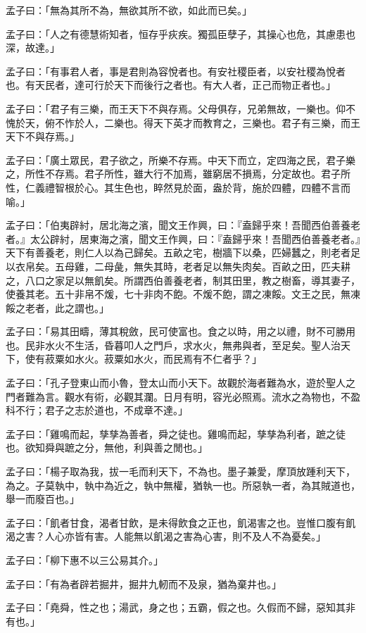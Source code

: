 \begin{pinyinscope}
孟子曰：「無為其所不為，無欲其所不欲，如此而已矣。」

孟子曰：「人之有德慧術知者，恒存乎疢疾。獨孤臣孽子，其操心也危，其慮患也深，故達。」

孟子曰：「有事君人者，事是君則為容悅者也。有安社稷臣者，以安社稷為悅者也。有天民者，達可行於天下而後行之者也。有大人者，正己而物正者也。」

孟子曰：「君子有三樂，而王天下不與存焉。父母俱存，兄弟無故，一樂也。仰不愧於天，俯不怍於人，二樂也。得天下英才而教育之，三樂也。君子有三樂，而王天下不與存焉。」

孟子曰：「廣土眾民，君子欲之，所樂不存焉。中天下而立，定四海之民，君子樂之，所性不存焉。君子所性，雖大行不加焉，雖窮居不損焉，分定故也。君子所性，仁義禮智根於心。其生色也，睟然見於面，盎於背，施於四體，四體不言而喻。」

孟子曰：「伯夷辟紂，居北海之濱，聞文王作興，曰：『盍歸乎來！吾聞西伯善養老者。』太公辟紂，居東海之濱，聞文王作興，曰：『盍歸乎來！吾聞西伯善養老者。』天下有善養老，則仁人以為己歸矣。五畝之宅，樹牆下以桑，匹婦蠶之，則老者足以衣帛矣。五母雞，二母彘，無失其時，老者足以無失肉矣。百畝之田，匹夫耕之，八口之家足以無飢矣。所謂西伯善養老者，制其田里，教之樹畜，導其妻子，使養其老。五十非帛不煖，七十非肉不飽。不煖不飽，謂之凍餒。文王之民，無凍餒之老者，此之謂也。」

孟子曰：「易其田疇，薄其稅斂，民可使富也。食之以時，用之以禮，財不可勝用也。民非水火不生活，昏暮叩人之門戶，求水火，無弗與者，至足矣。聖人治天下，使有菽粟如水火。菽粟如水火，而民焉有不仁者乎？」

孟子曰：「孔子登東山而小魯，登太山而小天下。故觀於海者難為水，遊於聖人之門者難為言。觀水有術，必觀其瀾。日月有明，容光必照焉。流水之為物也，不盈科不行；君子之志於道也，不成章不達。」

孟子曰：「雞鳴而起，孳孳為善者，舜之徒也。雞鳴而起，孳孳為利者，蹠之徒也。欲知舜與蹠之分，無他，利與善之閒也。」

孟子曰：「楊子取為我，拔一毛而利天下，不為也。墨子兼愛，摩頂放踵利天下，為之。子莫執中，執中為近之，執中無權，猶執一也。所惡執一者，為其賊道也，舉一而廢百也。」

孟子曰：「飢者甘食，渴者甘飲，是未得飲食之正也，飢渴害之也。豈惟口腹有飢渴之害？人心亦皆有害。人能無以飢渴之害為心害，則不及人不為憂矣。」

孟子曰：「柳下惠不以三公易其介。」

孟子曰：「有為者辟若掘井，掘井九軔而不及泉，猶為棄井也。」

孟子曰：「堯舜，性之也；湯武，身之也；五霸，假之也。久假而不歸，惡知其非有也。」


\end{pinyinscope}
